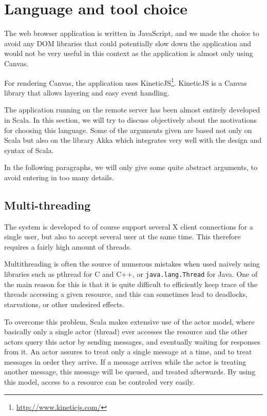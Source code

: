 \section{Language and tool choice}
%
The web browser application is written in JavaScript, and we made the 
choice to avoid any DOM libraries that could potentially slow down the 
application and would not be very useful in this context as 
the application is almost only using Canvas.

For rendering Canvas, the application uses KineticJS\footnote{\url{http://www.kineticjs.com/}}. 
KineticJS is a Canvas library that allows layering and easy event handling.
%

The application running on the remote server has been almost entirely developed in Scala. 
In this section, we will try to discuss objectively about 
the motivations for choosing this language. Some of the arguments given 
are based not only on Scala but also on the library Akka which integrates 
very well with the design and syntax of Scala.

In the following paragraphs, we will only give some quite abstract arguments, 
to avoid entering in too many details. %
%
\subsection{Multi-threading}
The system is developed to of course support several X client connections 
for a single user, but also to accept several user at the same time.
This therefore requires a fairly high amount of threads.

Multithreading is often the source of numerous mistakes when used naively 
using libraries such as pthread for C and C++, or \lstinline{java.lang.Thread} 
for Java. One of the main reason for this is that it is quite difficult to 
efficiently keep trace of the threads accessing a given resource, 
and this can sometimes lead to deadlocks, starvations, or other undesired 
effects\cite{multithread}.

To overcome this problem, Scala makes extensive use of the actor model, where 
basically only a single actor (thread) ever accesses the resource and 
the other actors query this actor by sending messages, and eventually waiting 
for responses from it. An actor assures to treat only a single message 
at a time, and to treat messages in order they arrive. If a message 
arrives while the actor is treating another message, this message will 
be queued, and treated afterwards. By using this model, access to a 
resource can be controled very easily.


